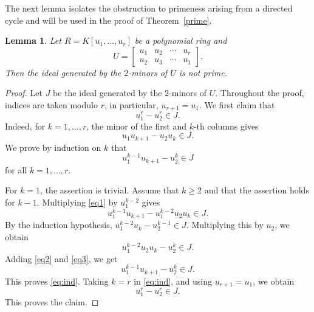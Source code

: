 \documentclass[12pt]{amsart}
\newtheorem{Lemma}[Theorem]{Lemma}
\begin{document}
The next lemma isolates the obstruction to primeness arising from a
directed cycle and will be used in the proof of Theorem~\ref{prime}.

\begin{Lemma}\label{lemma:cycle}
Let $R=K[u_1,\ldots,u_r]$ be a polynomial ring and
\[
U=
\begin{bmatrix}
u_1 & u_2 & \cdots & u_r\\
u_2 & u_3 & \cdots & u_1
\end{bmatrix}.
\]
Then the ideal generated by the $2$-minors of $U$ is not prime.
\end{Lemma}


\begin{proof}
Let $J$ be the ideal generated by the $2$-minors of $U$. Throughout the proof, indices are taken modulo $r$, in particular, $u_{r+1}=u_1$. We first claim that
\[
u_1^r-u_2^r\in J.
\]
Indeed, for $k=1,\ldots,r$, the minor of the first and $k$-th columns gives
\begin{equation}\label{eq1}
u_1u_{k+1}-u_2u_k\in J.
\end{equation}
We prove by induction on $k$ that
\begin{equation}\label{eq:ind}
u_1^{k-1}u_{k+1}-u_2^k\in J
\end{equation}
for all $k=1,\ldots,r$.

For $k=1$, the assertion is trivial. Assume that $k\geq 2$ and that the assertion holds for $k-1$. Multiplying \eqref{eq1} by $u_1^{k-2}$ gives
\begin{equation}\label{eq2}
u_1^{k-1}u_{k+1}-u_1^{k-2}u_2u_k\in J.
\end{equation}
By the induction hypothesis, $u_1^{k-2}u_k-u_2^{k-1}\in J.$ Multiplying this by $u_2$, we obtain
\begin{equation}\label{eq3}
u_1^{k-2}u_2u_k-u_2^k\in J.
\end{equation}
Adding \eqref{eq2} and \eqref{eq3}, we get
\[
u_1^{k-1}u_{k+1}-u_2^k\in J.
\]
This proves \eqref{eq:ind}. Taking $k=r$ in \eqref{eq:ind}, and using $u_{r+1}=u_1$, we obtain
\[
u_1^r-u_2^r\in J.
\]
This proves the claim.


\end{proof}
\end{document}
